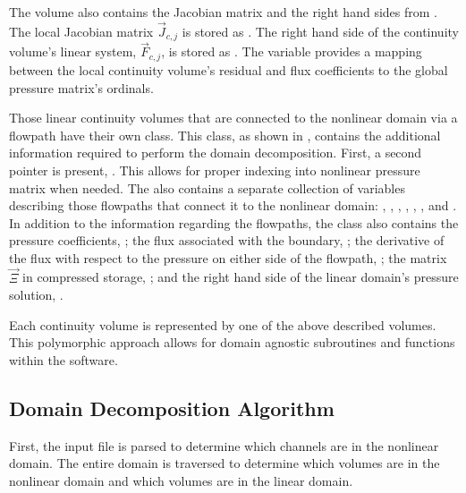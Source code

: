 The volume also contains the Jacobian matrix and the right hand sides from .
The local Jacobian matrix $\vec{J}_{c, j}$ is stored as .
The right hand side of the continuity volume's linear system, $\vec{F}_{c, j}$, is stored as .
The variable  provides a mapping between the local continuity volume's residual and flux coefficients to the global pressure matrix's ordinals.

Those linear continuity volumes that are connected to the nonlinear domain via a flowpath have their own  class.
This class, as shown in , contains the additional information required to perform the domain decomposition.
First, a second  pointer is present, .
This allows for proper indexing into nonlinear pressure matrix when needed.
The  also contains a separate collection of variables describing those flowpaths that connect it to the nonlinear domain: , , , , , , and .
In addition to the information regarding the flowpaths, the  class also contains the pressure coefficients, ; the flux associated with the boundary, ; the derivative of the flux with respect to the pressure on either side of the flowpath, ; the matrix $\vec{\Xi}$ in compressed storage, ; and the right hand side of the linear domain's pressure solution, .

Each continuity volume is represented by one of the above described volumes.
This polymorphic approach allows for domain agnostic subroutines and functions within the software.


\subsection{Domain Decomposition Algorithm}
\label{subsect:domDecompAlgorithm}

First, the input file is parsed to determine which channels are in the nonlinear domain.
The entire domain is traversed to determine which volumes are in the nonlinear domain and which volumes are in the linear domain.

